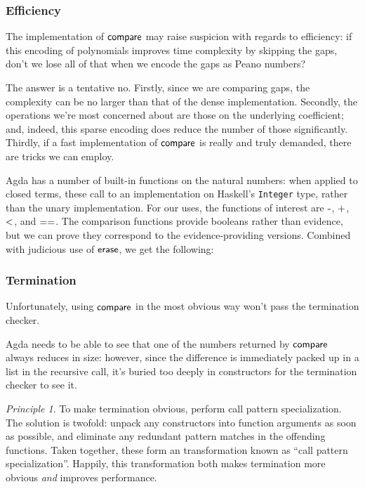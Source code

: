 \documentclass[draft, twocolumn]{article}
\theoremstyle{definition}
\theoremstyle{remark}
\newtheorem{principle}{Principle}[section]
\begin{document}
\subsubsection{Efficiency}
The implementation of \(\AgdaFunction{compare}\) may raise suspicion with
regards to efficiency: if this encoding of polynomials improves time complexity
by skipping the gaps, don't we lose all of that when we encode the gaps as Peano
numbers?

The answer is a tentative no. Firstly, since we are comparing gaps, the
complexity can be no larger than that of the dense implementation. Secondly, the
operations we're most concerned about are those on the underlying coefficient;
and, indeed, this sparse encoding does reduce the number of those significantly.
Thirdly, if a fast implementation of \(\AgdaFunction{compare}\) is really and
truly demanded, there are tricks we can employ.

Agda has a number of built-in functions on the natural numbers: when applied to
closed terms, these call to an implementation on Haskell's \texttt{Integer}
type, rather than the unary implementation. For our uses, the functions of
interest are \(\AgdaFunction{-}\), \(\AgdaFunction{+}\), \(\AgdaFunction{<}\),
and \(\AgdaFunction{==}\). The comparison functions provide booleans rather than
evidence, but we can prove they correspond to the evidence-providing versions.
Combined with judicious use of \(\AgdaFunction{erase}\), we get the following:
\subsubsection{Termination}
Unfortunately, using \(\AgdaFunction{compare}\) in the most obvious way won't
pass the termination checker.

Agda needs to be able to see that one of the numbers returned by
\(\AgdaFunction{compare}\) always reduces in size: however, since the difference
is immediately packed up in a list in the recursive call, it's buried too deeply
in constructors for the termination checker to see it.

\begin{principle}{To make termination obvious, perform call pattern
    specialization.}
The solution is twofold: unpack any constructors into function arguments as soon
as possible, and eliminate any redundant pattern matches in the offending
functions. Taken together, these form an transformation known as ``call pattern
specialization''\cite{jones_call-pattern_2007}\footnotemark. Happily, this
transformation both makes termination more obvious \emph{and} improves
performance.
\end{principle}
\end{document}
